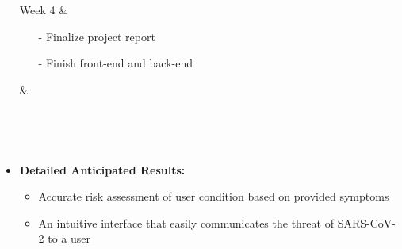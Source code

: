\documentclass{article}
\begin{document}
\begin{itemize}
\begin{table}[H]
\begin{tabularx}{\linewidth}
        \hline
        Week 4 
        & 
        \begin{itemize}[leftmargin=*] 
            \item[-] Finalize project report
            \item[-] Finish front-end and back-end
        \end{itemize}
        &
        \begin{itemize}[leftmargin=*] 
        \end{itemize}
        \\
        
        \hline
        \end{tabularx} \\
    \end{table}
    \item \textbf{Detailed Anticipated Results:}  
    \begin{itemize}
        \item Accurate risk assessment of user condition based on provided symptoms 
        \item An intuitive interface that easily communicates the threat of SARS-CoV-2 to a user
    \end{itemize}


    
    
\end{itemize}




\nocite{*}
\end{document}
